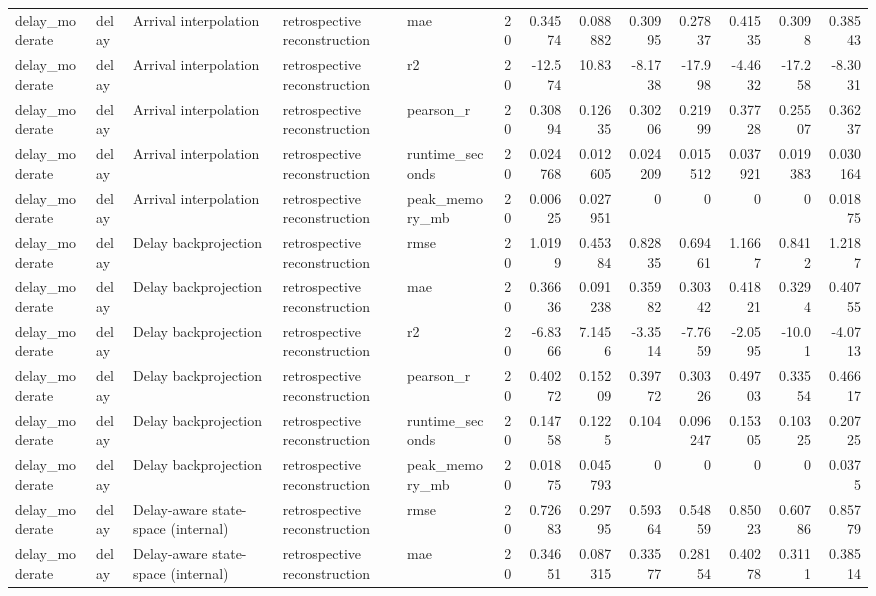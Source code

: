 \begin{table}[!htbp]
{{\begin{tabular}{lllllrrrrrrrr}
delay_moderate & delay & Arrival interpolation & retrospective reconstruction & mae & 20 & 0.34574 & 0.088882 & 0.30995 & 0.27837 & 0.41535 & 0.3098 & 0.38543 \\
delay_moderate & delay & Arrival interpolation & retrospective reconstruction & r2 & 20 & -12.574 & 10.83 & -8.1738 & -17.998 & -4.4632 & -17.258 & -8.3031 \\
delay_moderate & delay & Arrival interpolation & retrospective reconstruction & pearson_r & 20 & 0.30894 & 0.12635 & 0.30206 & 0.21999 & 0.37728 & 0.25507 & 0.36237 \\
delay_moderate & delay & Arrival interpolation & retrospective reconstruction & runtime_seconds & 20 & 0.024768 & 0.012605 & 0.024209 & 0.015512 & 0.037921 & 0.019383 & 0.030164 \\
delay_moderate & delay & Arrival interpolation & retrospective reconstruction & peak_memory_mb & 20 & 0.00625 & 0.027951 & 0 & 0 & 0 & 0 & 0.01875 \\
delay_moderate & delay & Delay backprojection & retrospective reconstruction & rmse & 20 & 1.0199 & 0.45384 & 0.82835 & 0.69461 & 1.1667 & 0.8412 & 1.2187 \\
delay_moderate & delay & Delay backprojection & retrospective reconstruction & mae & 20 & 0.36636 & 0.091238 & 0.35982 & 0.30342 & 0.41821 & 0.3294 & 0.40755 \\
delay_moderate & delay & Delay backprojection & retrospective reconstruction & r2 & 20 & -6.8366 & 7.1456 & -3.3514 & -7.7659 & -2.0595 & -10.01 & -4.0713 \\
delay_moderate & delay & Delay backprojection & retrospective reconstruction & pearson_r & 20 & 0.40272 & 0.15209 & 0.39772 & 0.30326 & 0.49703 & 0.33554 & 0.46617 \\
delay_moderate & delay & Delay backprojection & retrospective reconstruction & runtime_seconds & 20 & 0.14758 & 0.1225 & 0.104 & 0.096247 & 0.15305 & 0.10325 & 0.20725 \\
delay_moderate & delay & Delay backprojection & retrospective reconstruction & peak_memory_mb & 20 & 0.01875 & 0.045793 & 0 & 0 & 0 & 0 & 0.0375 \\
delay_moderate & delay & Delay-aware state-space (internal) & retrospective reconstruction & rmse & 20 & 0.72683 & 0.29795 & 0.59364 & 0.54859 & 0.85023 & 0.60786 & 0.85779 \\
delay_moderate & delay & Delay-aware state-space (internal) & retrospective reconstruction & mae & 20 & 0.34651 & 0.087315 & 0.33577 & 0.28154 & 0.40278 & 0.3111 & 0.38514 \\

\end{tabular}}}
\end{table}
